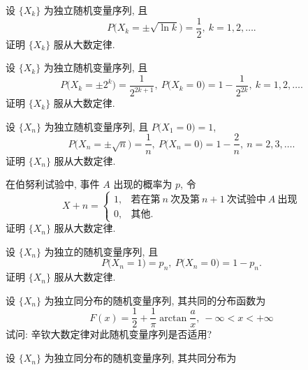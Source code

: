 \begin{xiti}
    \item 设 $ \{ X_k \} $ 为独立随机变量序列, 且
    \begin{equation*}
        P \bigl( X_k = \pm \sqrt{\ln k} \bigr) = \frac{1}{2}, \ k = 1, 2, \dotsc.
    \end{equation*}
    证明 $ \{ X_k \} $ 服从大数定律.
    \item 设 $ \{ X_k \} $ 为独立随机变量序列, 且
    \begin{equation*}
        P \bigl( X_k = \pm 2^k \bigr) = \frac{1}{2^{2k+1}}, \ P \bigl( X_k = 0 \bigr) = 1 - \frac{1}{2^{2k}}, \ k = 1, 2, \dotsc .
    \end{equation*}
    证明 $ \{ X_k \} $ 服从大数定律.
    \item 设 $ \{ X_n \} $ 为独立随机变量序列, 且 $ P \bigl( X_1 = 0 \bigr) = 1 $,
    \begin{equation*}
        P \bigl( X_n = \pm \sqrt{n} \bigr) = \frac{1}{n}, \ P \bigl( X_n = 0 \bigr) = 1 - \frac{2}{n}, \ n = 2, 3, \dotsc .
    \end{equation*}
    证明 $ \{ X_n \} $ 服从大数定律.
    \item 在伯努利试验中, 事件 $ A $ 出现的概率为 $ p $, 令
    \begin{equation*}
        X+n = 
        \begin{cases}
            1, & \text{若在第} \ n \ \text{次及第} \ n+1 \ \text{次试验中} \ A \ \text{出现}\\
            0, & \text{其他}.
        \end{cases}
    \end{equation*}
    证明 $ \{ X_n \} $ 服从大数定律.
    \item  设 $ \{ X_n \} $ 为独立的随机变量序列, 且
    \begin{equation*}
        P \bigl( X_n = 1 \bigr) = p_n, \ P \bigl( X_n = 0 \bigr) = 1 - p_n.
    \end{equation*}
    证明 $ \{ X_n \} $ 服从大数定律.
    \item 设 $ \{ X_n \} $ 为独立同分布的随机变量序列, 其共同的分布函数为
    \begin{equation*}
        F (x) = \frac{1}{2} + \frac{1}{\pi} \arctan \frac{a}{x}, \ -\infty < x < +\infty 
    \end{equation*}
    试问: 辛钦大数定律对此随机变量序列是否适用?
    \item 设 $ \{ X_n \} $ 为独立同分布的随机变量序列, 其共同分布为
    \begin{equation*}

\end{equation*}
\end{xiti}
